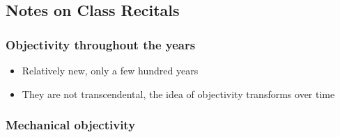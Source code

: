 \documentclass[a4paper]{article}
\begin{document}
\subsection{Notes on Class Recitals}
\subsubsection{Objectivity throughout the years}
\begin{itemize}
	\item Relatively new, only a few hundred years
	\item They are not transcendental, the idea of objectivity transforms over time
\end{itemize}
\subsubsection{Mechanical objectivity}
\end{document}
